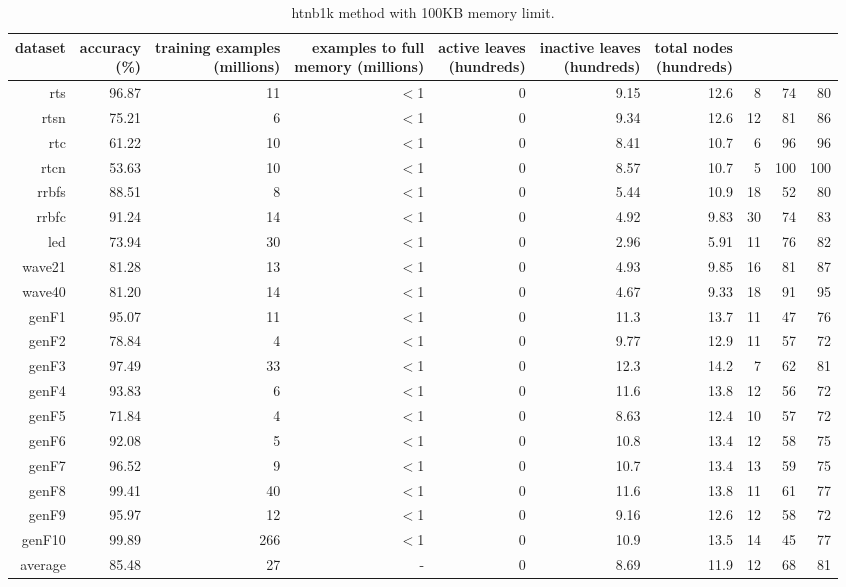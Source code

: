 \clearpage
\begin{table}
\caption{{\sc htnb1k} method with 100KB memory limit.}
\label{tab:htnb1k-100k}
\centering
\begin{tabular}{|r|r|r|r|r|r|r|r|r|r|}
\hline
dataset	&
\rotatebox{90}{\parbox{9em}{accuracy\\(\%)}} &
\rotatebox{90}{\parbox{9em}{training examples\\(millions)}} &
\rotatebox{90}{\parbox{9em}{examples to full\\memory (millions)}} &
\rotatebox{90}{\parbox{9em}{active leaves\\(hundreds)}} &
\rotatebox{90}{\parbox{9em}{inactive leaves\\(hundreds)}} &
\rotatebox{90}{\parbox{9em}{total nodes\\(hundreds)}} &
\rotatebox{90}{\parbox{9em}{tree depth}}	&
\rotatebox{90}{\parbox{9em}{training speed (\%)}} &
\rotatebox{90}{\parbox{9em}{prediction speed (\%)}} \\
\hline
{\sc rts} & 96.87 & 11 & $<$1 & 0 & 9.15 & 12.6 & 8 & 74 & 80 \\
{\sc rtsn} & 75.21 & 6 & $<$1 & 0 & 9.34 & 12.6 & 12 & 81 & 86 \\
{\sc rtc} & 61.22 & 10 & $<$1 & 0 & 8.41 & 10.7 & 6 & 96 & 96 \\
{\sc rtcn} & 53.63 & 10 & $<$1 & 0 & 8.57 & 10.7 & 5 & 100 & 100 \\
{\sc rrbfs} & 88.51 & 8 & $<$1 & 0 & 5.44 & 10.9 & 18 & 52 & 80 \\
{\sc rrbfc} & 91.24 & 14 & $<$1 & 0 & 4.92 & 9.83 & 30 & 74 & 83 \\
{\sc led} & 73.94 & 30 & $<$1 & 0 & 2.96 & 5.91 & 11 & 76 & 82 \\
{\sc wave21} & 81.28 & 13 & $<$1 & 0 & 4.93 & 9.85 & 16 & 81 & 87 \\
{\sc wave40} & 81.20 & 14 & $<$1 & 0 & 4.67 & 9.33 & 18 & 91 & 95 \\
{\sc genF1} & 95.07 & 11 & $<$1 & 0 & 11.3 & 13.7 & 11 & 47 & 76 \\
{\sc genF2} & 78.84 & 4 & $<$1 & 0 & 9.77 & 12.9 & 11 & 57 & 72 \\
{\sc genF3} & 97.49 & 33 & $<$1 & 0 & 12.3 & 14.2 & 7 & 62 & 81 \\
{\sc genF4} & 93.83 & 6 & $<$1 & 0 & 11.6 & 13.8 & 12 & 56 & 72 \\
{\sc genF5} & 71.84 & 4 & $<$1 & 0 & 8.63 & 12.4 & 10 & 57 & 72 \\
{\sc genF6} & 92.08 & 5 & $<$1 & 0 & 10.8 & 13.4 & 12 & 58 & 75 \\
{\sc genF7} & 96.52 & 9 & $<$1 & 0 & 10.7 & 13.4 & 13 & 59 & 75 \\
{\sc genF8} & 99.41 & 40 & $<$1 & 0 & 11.6 & 13.8 & 11 & 61 & 77 \\
{\sc genF9} & 95.97 & 12 & $<$1 & 0 & 9.16 & 12.6 & 12 & 58 & 72 \\
{\sc genF10} & 99.89 & 266 & $<$1 & 0 & 10.9 & 13.5 & 14 & 45 & 77 \\
\hline
average & 85.48 & 27 &  -  & 0 & 8.69 & 11.9 & 12 & 68 & 81 \\
\hline
\end{tabular}
\end{table}
